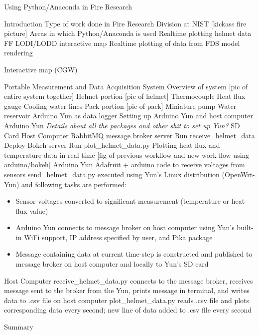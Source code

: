\documentclass{article}
\begin{document}
Using Python/Anaconda in Fire Research \\

\begin{outline}[enumerate]
\1 Introduction 
	\2 Type of work done in Fire Research Division at NIST [kickass fire picture]
	\2 Areas in which Python/Anaconda is used
		\3 Realtime plotting helmet data
		\3 FF LODI/LODD interactive map
		\3 Realtime plotting of data from FDS model rendering

\1 Interactive map (CGW)

\1 Portable Measurement and Data Acquisition System
	\2 Overview of system [pic of entire system together]
		\3 Helmet portion [pic of helmet]
			\4 Thermocouple 
			\4 Heat flux gauge
			\4 Cooling water lines
		\3 Pack portion	[pic of pack]
			\4 Miniature pump
			\4 Water reservoir
			\4 Arduino Yun as data logger
	\2 Setting up Arduino Yun and host computer 
		\3 Arduino Yun
			\4 \textit{Details about all the packages and other shit to set up Yun?}
			\4 SD Card
		\3 Host Computer
			\4 RabbitMQ message broker server
			\4 Run receive\_helmet\_data
			\4 Deploy Bokeh server
			\4 Run plot\_helmet\_data.py 
	\2 Plotting heat flux and temperature data in real time [fig of previous workflow and new work flow using arduino/bokeh]
		\3 Arduino Yun
			\4 Adafruit + arduino code to receive voltages from sensors
			\4 send\_helmet\_data.py executed using Yun's Linux distribution (OpenWrt-Yun) and following tasks are performed: \\ 
			\begin{itemize}
				\item Sensor voltages converted to significant measurement (temperature or heat flux value) 
				\item Arduino Yun connects to message broker on host computer using Yun's built-in WiFi support, IP address specified by user, and Pika package
				\item Message containing data at current time-step is constructed and published to message broker on host computer and locally to Yun's SD card \\
			\end{itemize}
		\3 Host Computer
			\4 receive\_helmet\_data.py connects to the message broker, receives message sent to the broker from the Yun, prints message in terminal, and writes data to .csv file on host computer
			\4 plot\_helmet\_data.py reads .csv file and plots corresponding data every second; new line of data added to .csv file every second

\1 Summary

\end{outline}
\end{document}
